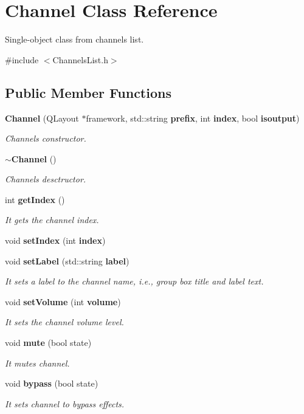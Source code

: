 \section{Channel Class Reference}
\label{class_channel}


Single-\/object class from channels list.  




{\ttfamily \#include $<$Channels\+List.\+h$>$}

\subsection*{Public Member Functions}
\begin{DoxyCompactItemize}
\item 
\textbf{ Channel} (Q\+Layout $\ast$framework, std\+::string \textbf{ prefix}, int \textbf{ index}, bool \textbf{ isoutput})
\begin{DoxyCompactList}\small\item\em Channels constructor. \end{DoxyCompactList}\item 
\textbf{ $\sim$\+Channel} ()
\begin{DoxyCompactList}\small\item\em Channels desctructor. \end{DoxyCompactList}\item 
int \textbf{ get\+Index} ()
\begin{DoxyCompactList}\small\item\em It gets the channel index. \end{DoxyCompactList}\item 
void \textbf{ set\+Index} (int \textbf{ index})
\item 
void \textbf{ set\+Label} (std\+::string \textbf{ label})
\begin{DoxyCompactList}\small\item\em It sets a label to the channel name, i.\+e., group box title and label text. \end{DoxyCompactList}\item 
void \textbf{ set\+Volume} (int \textbf{ volume})
\begin{DoxyCompactList}\small\item\em It sets the channel volume level. \end{DoxyCompactList}\item 
void \textbf{ mute} (bool state)
\begin{DoxyCompactList}\small\item\em It mutes channel. \end{DoxyCompactList}\item 
void \textbf{ bypass} (bool state)
\begin{DoxyCompactList}\small\item\em It sets channel to bypass effects. \end{DoxyCompactList}\end{DoxyCompactItemize}
